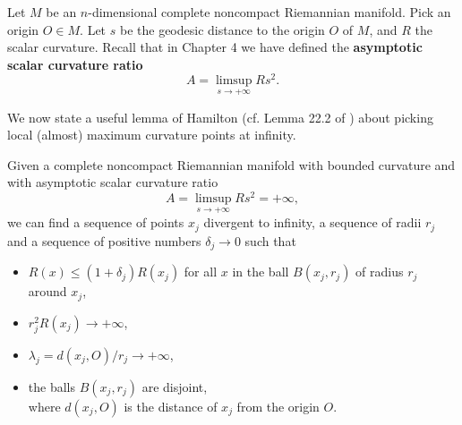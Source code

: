 Let $M$ be an $n$-dimensional complete noncompact Riemannian
manifold. Pick an origin $O\in M$. Let $s$ be the geodesic
distance to the origin $O$ of $M$, and $R$ the scalar curvature.
Recall that in Chapter 4 we have defined the {\bf asymptotic
scalar curvature ratio}
$$
A=\limsup_{s\rightarrow+\infty}Rs^2.
$$

We now state a useful lemma of Hamilton (cf. Lemma 22.2 of
\cite{Ha95F}) about picking local (almost) maximum curvature
points at infinity.

\begin{lemma} 
  \label{lem:cz-infinite-ascr-point-selection}

 Given a complete noncompact Riemannian manifold with
bounded curvature and with asymptotic scalar curvature ratio
$$
A=\limsup_{s\rightarrow+\infty}Rs^2=+\infty,
$$
we can find a sequence of points $x_j$ divergent to infinity, a
sequence of radii $r_j$ and a sequence of positive numbers
$\delta_j\rightarrow0$ such that
\begin{itemize}
\item[(i)] $R(x)\leq(1+\delta_j)R(x_j)$ for all $x$ in the ball
$B(x_j,r_j)$ of radius $r_j$ around $x_j$, \item[(ii)]
$r^2_jR(x_j)\rightarrow+\infty$, \item[(iii)]
$\lambda_j=d(x_j,O)/r_j\rightarrow+\infty$, \item[(iv)]
the balls $B(x_j,r_j)$ are disjoint, \\
where $d(x_j,O)$ is the distance of $x_j$ from the origin $O$.
\end{itemize}
\end{lemma}

